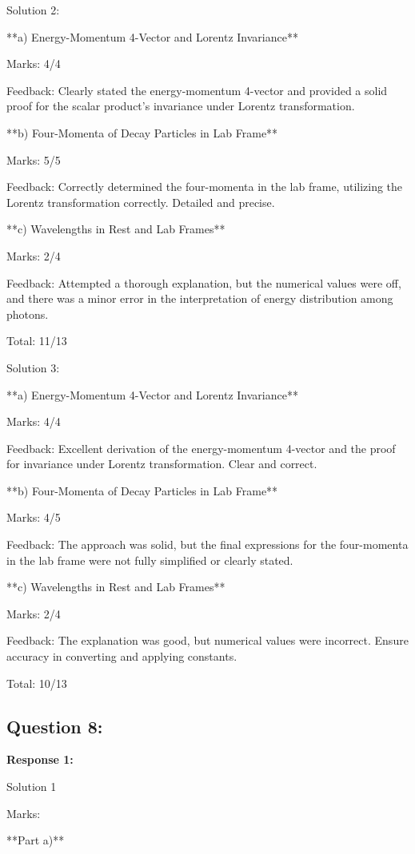 \documentclass[a4paper,11pt]{article}
\begin{document}
Solution 2:

**a) Energy-Momentum 4-Vector and Lorentz Invariance**

Marks: 4/4

Feedback: Clearly stated the energy-momentum 4-vector and provided a solid proof for the scalar product's invariance under Lorentz transformation.

**b) Four-Momenta of Decay Particles in Lab Frame**

Marks: 5/5

Feedback: Correctly determined the four-momenta in the lab frame, utilizing the Lorentz transformation correctly. Detailed and precise.

**c) Wavelengths in Rest and Lab Frames**

Marks: 2/4

Feedback: Attempted a thorough explanation, but the numerical values were off, and there was a minor error in the interpretation of energy distribution among photons.

Total: 11/13

Solution 3:

**a) Energy-Momentum 4-Vector and Lorentz Invariance**

Marks: 4/4

Feedback: Excellent derivation of the energy-momentum 4-vector and the proof for invariance under Lorentz transformation. Clear and correct.

**b) Four-Momenta of Decay Particles in Lab Frame**

Marks: 4/5

Feedback: The approach was solid, but the final expressions for the four-momenta in the lab frame were not fully simplified or clearly stated.

**c) Wavelengths in Rest and Lab Frames**

Marks: 2/4

Feedback: The explanation was good, but numerical values were incorrect. Ensure accuracy in converting and applying constants.

Total: 10/13

\subsection*{Question 8:}

\textbf{Response 1:}

Solution 1

Marks:

**Part a)**
\end{document}
